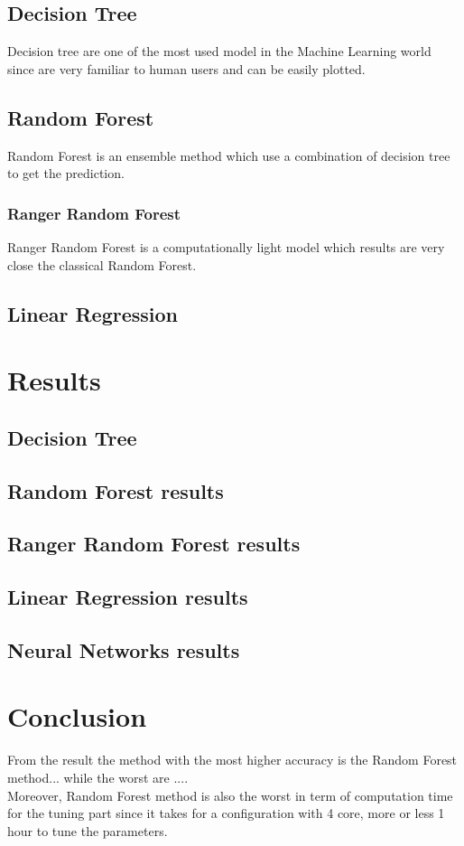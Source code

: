 \documentclass{FR16}
\begin{document}
\subsection{Decision Tree}
Decision  tree are one of the most used model in the Machine Learning world since are very familiar to human users and can be easily plotted. 
\\



\subsection{Random Forest}
Random Forest is an ensemble method which use a combination of decision tree to get the prediction.
\subsubsection{Ranger Random Forest}
Ranger Random Forest is a computationally light model which results are very close the classical Random Forest.
\\

\subsection{Linear Regression}



\newpage
\section{Results}
\subsection{Decision Tree}
\subsection{Random Forest results}
\subsection{Ranger Random Forest results}
\subsection{Linear Regression results}
\subsection{Neural Networks results}
\newpage
\section{Conclusion}
From the result the method with the most higher accuracy is the Random Forest method... while the worst are ....
\\Moreover, Random Forest method is also the worst in term of computation time for the tuning part since it takes for a configuration with 4 core, more or less 1 hour to tune the parameters. 
\end{document}
